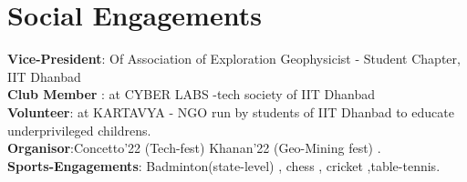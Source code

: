 \section{Social Engagements}
    \begin{itemize}[leftmargin=0.15in, label={}]
	\small{\item{
		\textbf{Vice-President}{: Of Association of Exploration Geophysicist - Student Chapter, IIT Dhanbad} \\
		\textbf{Club Member}{ : at CYBER LABS -tech society of IIT Dhanbad } \\
		\textbf{Volunteer}{: at KARTAVYA - NGO run by students of IIT Dhanbad to educate underprivileged childrens.} \\
  		\textbf{Organisor}{:Concetto'22 (Tech-fest)  Khanan'22 (Geo-Mining fest) .} \\
        \textbf{Sports-Engagements}{: Badminton(state-level) , chess , cricket ,table-tennis.}
	}}
    \end{itemize}